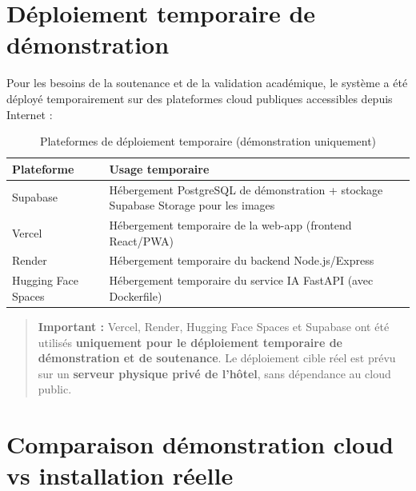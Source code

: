 \section{Déploiement temporaire de démonstration}
\label{sec:deploiement_demo}

Pour les besoins de la soutenance et de la validation académique, le système a été déployé temporairement sur des plateformes cloud publiques accessibles depuis Internet :

\begin{table}[H]
\centering
\caption{Plateformes de déploiement temporaire (démonstration uniquement)}
\label{tab:deploiement_demo}
\begin{tabular}{|l|p{8cm}|}
\hline
\textbf{Plateforme} & \textbf{Usage temporaire} \\
\hline
Supabase & Hébergement PostgreSQL de démonstration + stockage Supabase Storage pour les images \\
\hline
Vercel & Hébergement temporaire de la web-app (frontend React/PWA) \\
\hline
Render & Hébergement temporaire du backend Node.js/Express \\
\hline
Hugging Face Spaces & Hébergement temporaire du service IA FastAPI (avec Dockerfile) \\
\hline
\end{tabular}
\end{table}

\begin{quote}
\textbf{Important :} Vercel, Render, Hugging Face Spaces et Supabase ont été utilisés \textbf{uniquement pour le déploiement temporaire de démonstration et de soutenance}. Le déploiement cible réel est prévu sur un \textbf{serveur physique privé de l'hôtel}, sans dépendance au cloud public.
\end{quote}

\section{Comparaison démonstration cloud vs installation réelle}
\label{sec:difference_demo_prod}

